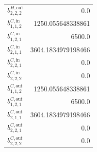 \documentclass{article}%
\begin{document}
\begin{multicols*}{3}
\begin{supertabular}{lr}
	$b_{2,2,2}^{H,\text{out}}$ & 0.0 \\%
	$b_{1,1,2}^{C,\text{in}}$ & 1250.055648338861 \\%
	$b_{1,2,1}^{C,\text{in}}$ & 6500.0 \\%
	$b_{2,1,1}^{C,\text{in}}$ & 3604.1834979198466 \\%
	$b_{2,2,1}^{C,\text{in}}$ & 0.0 \\%
	$b_{2,2,2}^{C,\text{in}}$ & 0.0 \\%
	$b_{1,1,2}^{C,\text{out}}$ & 1250.055648338861 \\%
	$b_{1,2,1}^{C,\text{out}}$ & 6500.0 \\%
	$b_{2,1,1}^{C,\text{out}}$ & 3604.1834979198466 \\%
	$b_{2,2,1}^{C,\text{out}}$ & 0.0 \\%
	$b_{2,2,2}^{C,\text{out}}$ & 0.0 \\%
\end{supertabular}%
\end{multicols*}%
\end{document}
